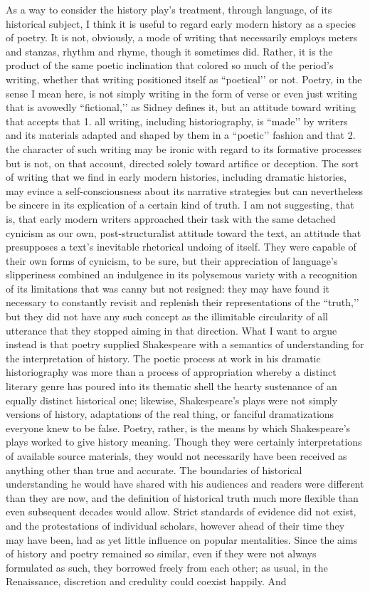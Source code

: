 As a way to consider the history play's treatment, through language, of its historical subject, I think it is useful to regard early modern history as a species of poetry. It is not, obviously, a mode of writing that necessarily employs meters and stanzas, rhythm and rhyme, though it sometimes did. Rather, it is the product of the same poetic inclination that colored so much of the period’s writing, whether that writing positioned itself as ``poetical’’ or not. Poetry, in the sense I mean here, is not simply writing in the form of verse or even just writing that is avowedly ``fictional,’’ as Sidney defines it, but an attitude toward writing that accepts that 1. all writing, including historiography, is ``made’’ by writers and its materials adapted and shaped by them in a ``poetic’’ fashion and that 2. the character of such writing may be ironic with regard to its formative processes but is not, on that account, directed solely toward artifice or deception. The sort of writing that we find in early modern histories, including dramatic histories, may evince a self-consciousness about its narrative strategies but can nevertheless be sincere in its explication of a certain kind of truth. I am not suggesting, that is, that early modern writers approached their task with the same detached cynicism as our own, post-structuralist attitude toward the text, an attitude that presupposes a text’s inevitable rhetorical undoing of itself. They were capable of their own forms of cynicism, to be sure, but their appreciation of language’s slipperiness combined an indulgence in its polysemous variety with a recognition of its limitations that was canny but not resigned: they may have found it necessary to constantly revisit and replenish their representations of the ``truth,’’ but they did not have any such concept as the illimitable circularity of all utterance that they stopped aiming in that direction. What I want to argue instead is that poetry supplied Shakespeare with a semantics of understanding for the interpretation of history. The poetic process at work in his dramatic historiography was more than a process of appropriation whereby a distinct literary genre has poured into its thematic shell the hearty sustenance of an equally distinct historical one; likewise, Shakespeare's plays were not simply versions of history, adaptations of the real thing, or fanciful dramatizations everyone knew to be false. Poetry, rather, is the means by which Shakespeare's plays worked to give history meaning. Though they were certainly interpretations of available source materials, they would not necessarily have been received as anything other than true and accurate. The boundaries of historical understanding he would have shared with his audiences and readers were different than they are now, and the definition of historical truth much more flexible than even subsequent decades would allow. Strict standards of evidence did not exist, and the protestations of individual scholars, however ahead of their time they may have been, had as yet little influence on popular mentalities. Since the aims of history and poetry remained so similar, even if they were not always formulated as such, they borrowed freely from each other; as usual, in the Renaissance, discretion and credulity could coexist happily. And 